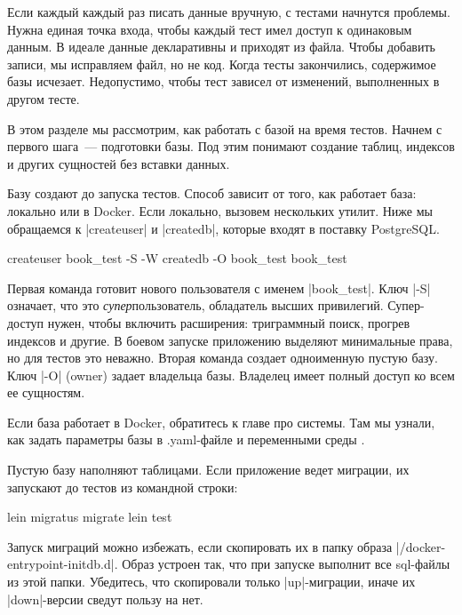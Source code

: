 Если каждый каждый раз писать данные вручную, с тестами начнутся проблемы. Нужна
единая точка входа, чтобы каждый тест имел доступ к одинаковым данным. В идеале
данные декларативны и приходят из файла. Чтобы добавить записи, мы исправляем
файл, но не код. Когда тесты закончились, содержимое базы исчезает. Недопустимо,
чтобы тест зависел от изменений, выполненных в другом тесте.

В этом разделе мы рассмотрим, как работать с базой на время тестов. Начнем с
первого шага~--- подготовки базы. Под этим понимают создание таблиц, индексов и
других сущностей без вставки данных.

Базу создают до запуска тестов. Способ зависит от того, как работает база:
локально или в Docker. Если локально, вызовем нескольких утилит. Ниже мы
обращаемся к \spverb|createuser| и \spverb|createdb|, которые входят в поставку
PostgreSQL.

\begin{english}
  \begin{bash}
createuser book_test -S -W
createdb -O book_test book_test
  \end{bash}
\end{english}

Первая команда готовит нового пользователя с именем \spverb|book_test|. Ключ
\spverb|-S| означает, что это \emph{супер}пользователь, обладатель высших
привилегий. Супер-доступ нужен, чтобы включить расширения: триграммный поиск,
прогрев индексов и другие. В боевом запуске приложению выделяют минимальные
права, но для тестов это неважно. Вторая команда создает одноименную пустую
базу. Ключ \spverb|-O| (owner) задает владельца базы. Владелец имеет полный
доступ ко всем ее сущностям.

Если база работает в Docker, обратитесь к главе про системы. Там мы узнали, как
задать параметры базы в .yaml-файле и переменными среды .

Пустую базу наполняют таблицами. Если приложение ведет миграции, их запускают до
тестов из командной строки:

\begin{english}
  \begin{clojure}
lein migratus migrate
lein test
  \end{clojure}
\end{english}

Запуск миграций можно избежать, если скопировать их в папку образа
\spverb|/docker-entrypoint-initdb.d|. Образ устроен так, что при запуске
выполнит все sql-файлы из этой папки. Убедитесь, что скопировали только
\spverb|up|-миграции, иначе их \spverb|down|-версии сведут пользу на нет.

